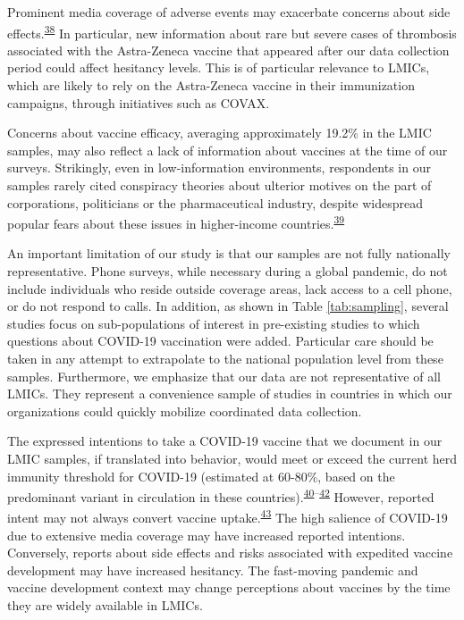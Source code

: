 \documentclass[
  12pt,
]{article}
\begin{document}
Prominent media coverage of adverse events may exacerbate concerns about side effects.\textsuperscript{\protect\hyperlink{ref-stein2017golden}{38}} In particular, new information about rare but severe cases of thrombosis associated with the Astra-Zeneca vaccine that appeared after our data collection period could affect hesitancy levels. This is of particular relevance to LMICs, which are likely to rely on the Astra-Zeneca vaccine in their immunization campaigns, through initiatives such as COVAX.

Concerns about vaccine efficacy, averaging approximately 19.2\% in the LMIC samples, may also reflect a lack of information about vaccines at the time of our surveys. Strikingly, even in low-information environments, respondents in our samples rarely cited conspiracy theories about ulterior motives on the part of corporations, politicians or the pharmaceutical industry, despite widespread popular fears about these issues in higher-income countries.\textsuperscript{\protect\hyperlink{ref-loomba_measuring_2021}{39}}

An important limitation of our study is that our samples are not fully nationally representative. Phone surveys, while necessary during a global pandemic, do not include individuals who reside outside coverage areas, lack access to a cell phone, or do not respond to calls. In addition, as shown in Table \ref{tab:sampling}, several studies focus on sub-populations of interest in pre-existing studies to which questions about COVID-19 vaccination were added. Particular care should be taken in any attempt to extrapolate to the national population level from these samples. Furthermore, we emphasize that our data are not representative of all LMICs. They represent a convenience sample of studies in countries in which our organizations could quickly mobilize coordinated data collection.

The expressed intentions to take a COVID-19 vaccine that we document in our LMIC samples, if translated into behavior, would meet or exceed the current herd immunity threshold for COVID-19 (estimated at 60-80\%, based on the predominant variant in circulation in these countries).\textsuperscript{\protect\hyperlink{ref-omer2020herd}{40}--\protect\hyperlink{ref-mcneil_2021}{42}} However, reported intent may not always convert vaccine uptake.\textsuperscript{\protect\hyperlink{ref-mceachanetal2011}{43}} The high salience of COVID-19 due to extensive media coverage may have increased reported intentions. Conversely, reports about side effects and risks associated with expedited vaccine development may have increased hesitancy. The fast-moving pandemic and vaccine development context may change perceptions about vaccines by the time they are widely available in LMICs.
\end{document}
